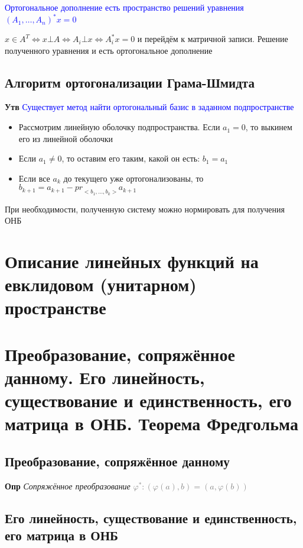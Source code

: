 \documentclass[a4paper, 14pt]{article}
\begin{document}
    \textcolor{blue}{Ортогональное дополнение есть пространство решений уравнения $(A_1, \dots, A_n)^* x = 0$}

    $x \in A^T \Leftrightarrow x \bot A \Leftrightarrow A_i \bot x \Leftrightarrow A_i^* x = 0$ и перейдём к матричной
    записи.
    Решение полученного уравнения и есть ортогональное дополнение

    \subsection{Алгоритм ортогонализации Грама-Шмидта}

    \textbf{Утв} \textcolor{blue}{Существует метод найти ортогональный базис в заданном подпространстве}

    \begin{itemize}
        \item Рассмотрим линейную оболочку подпространства.
        Если $a_1 = 0$, то выкинем его из линейной оболочки
        \item Если $a_1 \neq 0$, то оставим его таким, какой он есть: $b_1 = a_1$
        \item Если все $a_k$ до текущего уже ортогонализованы, то $b_{k+1} = a_{k+1} - {pr}_{<b_1, \dots, b_k>} a_{k+1}$
    \end{itemize}

    При необходимости, полученную систему можно нормировать для получения ОНБ


    \section{Описание линейных функций на евклидовом (унитарном) пространстве}

    \section{Преобразование, сопряжённое данному.
    Его линейность, существование и единственность, его матрица в ОНБ.
    Теорема Фредгольма}

    \subsection{Преобразование, сопряжённое данному}

    \textbf{Опр} \textit{Сопряжённое преобразование} \textcolor{gray}{$\varphi^*: (\varphi(a), b) = (a, \varphi(b))$}

    \subsection{Его линейность, существование и единственность, его матрица в ОНБ}
\end{document}
